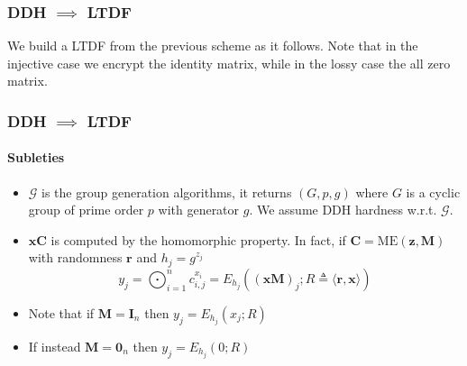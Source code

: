 \documentclass{beamer}
\begin{document}
\begin{frame}
    \frametitle{DDH $\implies$ LTDF}
    We build a LTDF from the previous scheme as it follows. Note
    that in the injective case we encrypt the identity matrix, while
    in the lossy case the all zero matrix.
    \begin{center}
        \begin{pchstack}
            \begin{pcvstack}

                \pcvspace

            \end{pcvstack}
        \end{pchstack}
    \end{center}
\end{frame}
\begin{frame}
    \frametitle{DDH $\implies$ LTDF}
    \framesubtitle{Subleties}
    \begin{itemize}
        \item $\mathcal{G}$ is the group generation algorithms, it returns $(G, p, g)$ where
              $G$ is a cyclic group of prime order $p$ with generator $g$. We assume DDH hardness w.r.t. $\mathcal{G}$.
        \item $\mathbf{xC}$ is computed by the homomorphic property.
              In fact, if $\mathbf{C} = \mathrm{ME}(\mathbf{z}, \mathbf{M})$ with randomness $\mathbf{r}$ and $h_j = g^{z_j}$
              \[ y_j = \bigodot_{i=1}^n c_{i,j}^{x_i} = E_{h_j}((\mathbf{xM})_j ; R \triangleq \langle \mathbf{r}, \mathbf{x} \rangle) \]

        \item Note that if $\mathbf{M} = \mathbf{I}_n$ then $y_j = E_{h_j}(x_j; R)$
        \item If instead $\mathbf{M} = \mathbf{0}_n$ then $y_j = E_{h_j}(0; R)$
    \end{itemize}
\end{frame}
\end{document}
